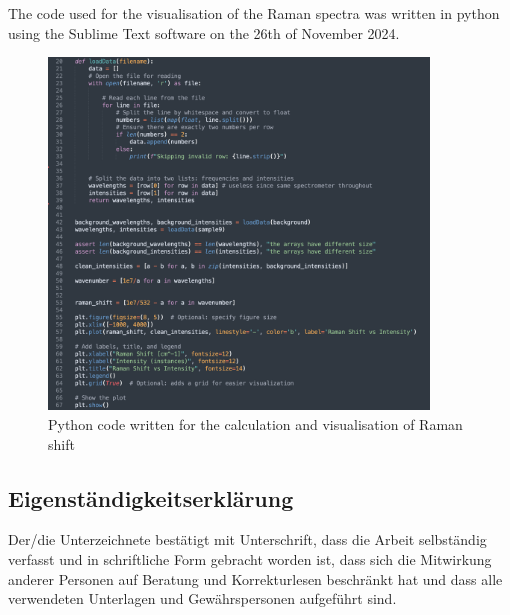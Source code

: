 The code used for the visualisation of the Raman spectra was written in python using the Sublime Text software on the 26th of November 2024.
\\


\begin{figure}[h]
    \centering
    \includegraphics[width=0.9\textwidth]{images/code_raman_shift.png}
    \caption{Python code written for the calculation and visualisation of Raman shift}
    \label{fig:python}
\end{figure}

\newpage

\subsection*{Eigenständigkeitserklärung}

Der/die Unterzeichnete bestätigt mit Unterschrift, dass die Arbeit selbständig verfasst und in schriftliche Form gebracht worden ist, dass sich die Mitwirkung anderer Personen auf Beratung und Korrekturlesen beschränkt hat und dass alle verwendeten Unterlagen und Gewährspersonen aufgeführt sind.